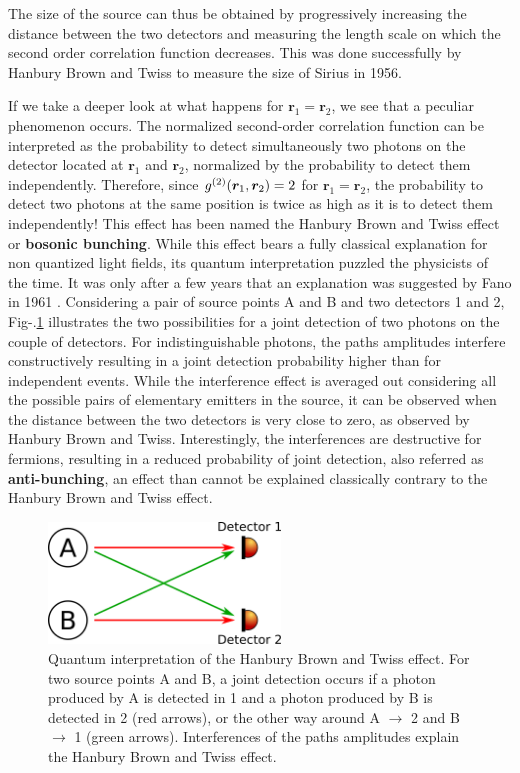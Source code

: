 \noindent The size of the source can thus be obtained by progressively increasing the distance between the two detectors and measuring the length scale on which the second order correlation function decreases. This was done successfully by Hanbury Brown and Twiss \cite{brown1956test} to measure the size of Sirius in 1956.

If we take a deeper look at what happens for $\bm{r}_1=\bm{r}_2$, we see that a peculiar phenomenon occurs. The normalized second-order correlation function can be interpreted as the probability to detect simultaneously two photons on the detector located at $\bm{r}_1$ and $\bm{r}_2$, normalized by the probability to detect them independently. Therefore, since $g^{(2)} (\bm{r}_1,\bm{r}_2)=2$ for $\bm{r}_1=\bm{r}_2$, the probability to detect two photons at the same position is twice as high as it is to detect them independently! This effect has been named the Hanbury Brown and Twiss effect or \textbf{bosonic bunching}. While this effect bears a fully classical explanation for non quantized light fields, its quantum interpretation puzzled the physicists of the time. It was only after a few years that an explanation was suggested by Fano in 1961 \cite{fano1961quantum}. Considering a pair of source points A and B and two detectors 1 and 2, Fig-.\ref{fig:HBT_scheme} illustrates the two possibilities for a joint detection of two photons on the couple of detectors. For indistinguishable photons, the paths amplitudes interfere constructively resulting in a joint detection probability higher than for independent events. While the interference effect is averaged out considering all the possible pairs of elementary emitters in the source, it can be observed when the distance between the two detectors is very close to zero, as observed by Hanbury Brown and Twiss. Interestingly, the interferences are destructive for fermions, resulting in a reduced probability of joint detection, also referred as \textbf{anti-bunching}, an effect than cannot be explained classically contrary to the Hanbury Brown and Twiss effect. 

\begin{figure}
    \centering
    \includegraphics[width=0.55\textwidth]{Fig/Chapter1/HBT_scheme.png}
    \caption{Quantum interpretation of the Hanbury Brown and Twiss effect. For two source points A and B, a joint detection occurs if a photon produced by A is detected in 1 and a photon produced by B is detected in 2 (red arrows), or the other way around A $\rightarrow$ 2 and B $\rightarrow$ 1 (green arrows). Interferences of the paths amplitudes explain the Hanbury Brown and Twiss effect.}
    \label{fig:HBT_scheme}
\end{figure}

